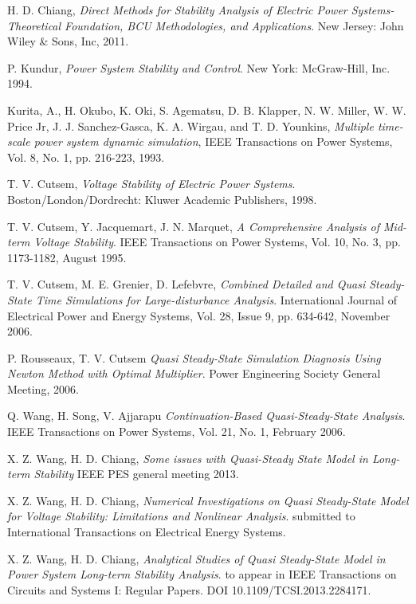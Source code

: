 \documentclass[journal]{IEEEtran}
\begin{document}
\begin{thebibliography}{1}
H. D. Chiang, {\em Direct Methods for Stability Analysis of Electric Power Systems-Theoretical Foundation, BCU Methodologies, and Applications}.
\newblock New Jersey: John Wiley \& Sons, Inc, 2011.

P. Kundur, {\em Power System Stability and Control}.
\newblock New York: McGraw-Hill, Inc. 1994.

Kurita, A., H. Okubo, K. Oki, S. Agematsu, D. B. Klapper, N. W. Miller, W. W. Price Jr, J. J. Sanchez-Gasca, K. A. Wirgau, and T. D. Younkins,
{\em Multiple time-scale power system dynamic simulation},
\newblock IEEE Transactions on Power Systems, Vol. 8, No. 1, pp. 216-223, 1993.


T. V. Cutsem, {\em Voltage Stability of Electric Power Systems}.
\newblock Boston/London/Dordrecht: Kluwer Academic Publishers, 1998.


T. V. Cutsem, Y. Jacquemart, J. N. Marquet, {\em A Comprehensive Analysis of Mid-term Voltage Stability}.
\newblock IEEE Transactions on Power Systems, Vol. 10, No. 3, pp. 1173-1182, August 1995.

T. V. Cutsem, M. E. Grenier, D. Lefebvre, {\em Combined Detailed and Quasi Steady-State Time Simulations for Large-disturbance Analysis}.
\newblock International Journal of Electrical Power and Energy Systems, Vol. 28, Issue 9, pp. 634-642, November 2006.

P. Rousseaux, T. V. Cutsem {\em Quasi Steady-State Simulation Diagnosis Using Newton Method with Optimal Multiplier}.
\newblock Power Engineering Society General Meeting, 2006.

Q. Wang, H. Song, V. Ajjarapu {\em Continuation-Based Quasi-Steady-State Analysis}.
\newblock IEEE Transactions on Power Systems, Vol. 21, No. 1, February 2006.


X. Z. Wang, H. D. Chiang, {\em Some issues with Quasi-Steady State Model in Long-term Stability}
\newblock IEEE PES general meeting 2013.

X. Z. Wang, H. D. Chiang, {\em Numerical Investigations on Quasi Steady-State Model for Voltage Stability: Limitations and Nonlinear Analysis}.
\newblock submitted to International Transactions on Electrical Energy Systems.

X. Z. Wang, H. D. Chiang,
{\em Analytical Studies of Quasi Steady-State Model in Power System Long-term Stability Analysis}.
\newblock to appear in IEEE Transactions on Circuits and Systems I: Regular Papers. DOI 10.1109/TCSI.2013.2284171.




\end{thebibliography}
\end{document}
